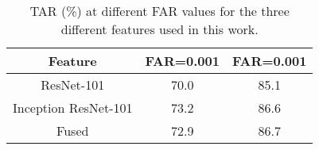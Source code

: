 \documentclass[10pt,twocolumn,letterpaper]{article}
\begin{document}
\begin{table}[!htpb]
  \centering
  \caption{TAR (\%) at different FAR values for the three different features used in this work.}
    \label{1}
  \begin{tabular}{|c|c|c|}
  \hline
  Feature    &FAR=0.001  &FAR=0.001 \\
  \hline
  ResNet-101 &70.0       &85.1 \\
  \hline
  Inception ResNet-101 &73.2 &86.6 \\
  \hline
  Fused      &72.9       &86.7 \\
  \hline
  \end{tabular}
\end{table}


{\small


}
\end{document}
